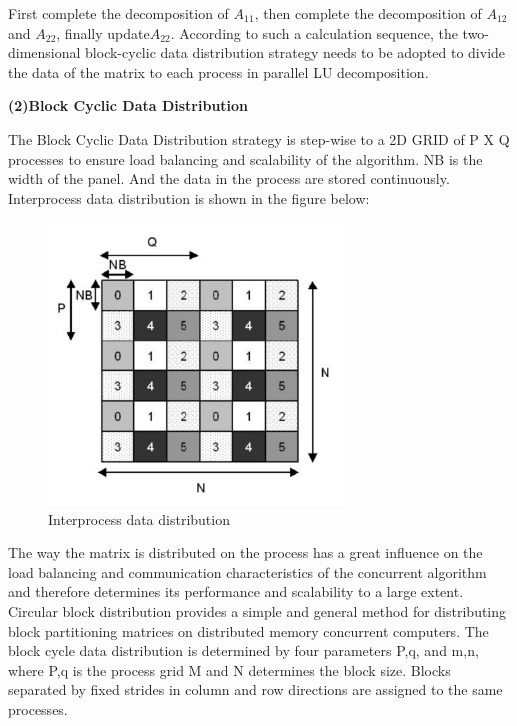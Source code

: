 \documentclass[a4paper,12pt]{article}
\begin{document}
First complete the decomposition of $A_{11}$, then complete the decomposition of $A_{12}$and $A_{22}$, finally update$A_{22}$. According to such a calculation sequence, the two-dimensional block-cyclic data distribution strategy needs to be adopted to divide the data of the matrix to each process in parallel LU decomposition.

\textbf{(2)Block Cyclic Data Distribution}

The Block Cyclic Data Distribution strategy is step-wise to a 2D GRID of P X Q processes to ensure load balancing and scalability of the algorithm. NB is the width of the panel. And the data in the process are stored continuously. Interprocess data distribution is shown in the figure below:

\begin{figure}[H]
    \centering
    \includegraphics[width=0.7\textwidth]{Interprocess_data_distribution.png}
    \caption{Interprocess data distribution}
    \label{fig:interprocess_data}
\end{figure}

The way the matrix is distributed on the process has a great influence on the load balancing and communication characteristics of the concurrent algorithm and therefore determines its performance and scalability to a large extent. Circular block distribution provides a simple and general method for distributing block partitioning matrices on distributed memory concurrent computers. The block cycle data distribution is determined by four parameters P,q, and m,n, where P,q is the process grid M and N determines the block size. Blocks separated by fixed strides in column and row directions are assigned to the same processes.
\end{document}
